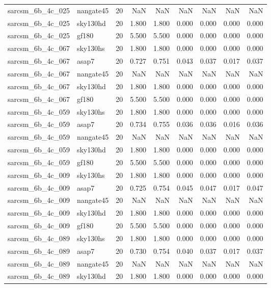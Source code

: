 \begin{tabular}{llrrrrrrr}
sarcsm\_6b\_4c\_025 & nangate45 & 20 & NaN & NaN & NaN & NaN & NaN & NaN \\
sarcsm\_6b\_4c\_025 & sky130hd & 20 & 1.800 & 1.800 & 0.000 & 0.000 & 0.000 & 0.000 \\
sarcsm\_6b\_4c\_025 & gf180 & 20 & 5.500 & 5.500 & 0.000 & 0.000 & 0.000 & 0.000 \\
sarcsm\_6b\_4c\_067 & sky130hs & 20 & 1.800 & 1.800 & 0.000 & 0.000 & 0.000 & 0.000 \\
sarcsm\_6b\_4c\_067 & asap7 & 20 & 0.727 & 0.751 & 0.043 & 0.037 & 0.017 & 0.037 \\
sarcsm\_6b\_4c\_067 & nangate45 & 20 & NaN & NaN & NaN & NaN & NaN & NaN \\
sarcsm\_6b\_4c\_067 & sky130hd & 20 & 1.800 & 1.800 & 0.000 & 0.000 & 0.000 & 0.000 \\
sarcsm\_6b\_4c\_067 & gf180 & 20 & 5.500 & 5.500 & 0.000 & 0.000 & 0.000 & 0.000 \\
sarcsm\_6b\_4c\_059 & sky130hs & 20 & 1.800 & 1.800 & 0.000 & 0.000 & 0.000 & 0.000 \\
sarcsm\_6b\_4c\_059 & asap7 & 20 & 0.734 & 0.755 & 0.036 & 0.036 & 0.016 & 0.036 \\
sarcsm\_6b\_4c\_059 & nangate45 & 20 & NaN & NaN & NaN & NaN & NaN & NaN \\
sarcsm\_6b\_4c\_059 & sky130hd & 20 & 1.800 & 1.800 & 0.000 & 0.000 & 0.000 & 0.000 \\
sarcsm\_6b\_4c\_059 & gf180 & 20 & 5.500 & 5.500 & 0.000 & 0.000 & 0.000 & 0.000 \\
sarcsm\_6b\_4c\_009 & sky130hs & 20 & 1.800 & 1.800 & 0.000 & 0.000 & 0.000 & 0.000 \\
sarcsm\_6b\_4c\_009 & asap7 & 20 & 0.725 & 0.754 & 0.045 & 0.047 & 0.017 & 0.047 \\
sarcsm\_6b\_4c\_009 & nangate45 & 20 & NaN & NaN & NaN & NaN & NaN & NaN \\
sarcsm\_6b\_4c\_009 & sky130hd & 20 & 1.800 & 1.800 & 0.000 & 0.000 & 0.000 & 0.000 \\
sarcsm\_6b\_4c\_009 & gf180 & 20 & 5.500 & 5.500 & 0.000 & 0.000 & 0.000 & 0.000 \\
sarcsm\_6b\_4c\_089 & sky130hs & 20 & 1.800 & 1.800 & 0.000 & 0.000 & 0.000 & 0.000 \\
sarcsm\_6b\_4c\_089 & asap7 & 20 & 0.730 & 0.754 & 0.040 & 0.037 & 0.017 & 0.037 \\
sarcsm\_6b\_4c\_089 & nangate45 & 20 & NaN & NaN & NaN & NaN & NaN & NaN \\
sarcsm\_6b\_4c\_089 & sky130hd & 20 & 1.800 & 1.800 & 0.000 & 0.000 & 0.000 & 0.000 \\

\end{tabular}
